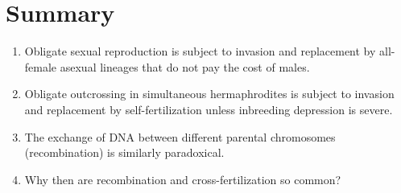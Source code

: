 \documentclass[
  letterpaper,
]{book}
\providecommand{\tightlist}{%
  \setlength{\itemsep}{0pt}\setlength{\parskip}{0pt}}\usepackage{longtable,booktabs,array}
\begin{document}
\hypertarget{summary}{%
\section{Summary}\label{summary}}

\begin{enumerate}
\def\labelenumi{\arabic{enumi}.}
\tightlist
\item
  Obligate sexual reproduction is subject to invasion and replacement by
  all-female asexual lineages that do not pay the cost of males.
\item
  Obligate outcrossing in simultaneous hermaphrodites is subject to
  invasion and replacement by self-fertilization unless inbreeding
  depression is severe.
\item
  The exchange of DNA between different parental chromosomes
  (recombination) is similarly paradoxical.
\item
  Why then are recombination and cross-fertilization so common?
\end{enumerate}
\end{document}
